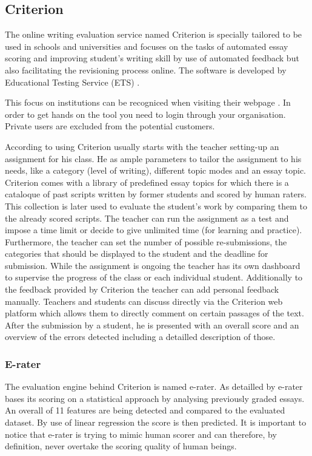 \documentclass[runningheads]{llncs}
\let\OldTextregistered\textregistered
\renewcommand{\textregistered}{\OldTextregistered\xspace}%
\begin{document}
\subsection{Criterion\textregistered}
The online writing evaluation service named Criterion\textregistered is specially tailored to be used in schools and universities and focuses on the tasks of automated essay scoring and improving student's writing skill by use of automated feedback but also facilitating the revisioning process online. The software is developed by Educational Testing Service (ETS) \citep{noauthor_ets_nodate}.

This focus on institutions can be recogniced when visiting their webpage \citep{noauthor_ets_nodate}. In order to get hands on the tool you need to login through your organisation. Private users are excluded from the potential customers. 

According to \textcite{lim_review_2012} using Criterion\textregistered usually starts with the teacher setting-up an assignment for his class. He as ample parameters to tailor the assignment to his needs, like a category (level of writing), different topic modes and an essay topic. Criterion\textregistered comes with a library of predefined essay topics for which there is a cataloque of past scripts written by former students and scored by human raters. This collection is later used to evaluate the student's work by comparing them to the already scored scripts. The teacher can run the assignment as a test and impose a time limit or decide to give unlimited time (for learning and practice). Furthermore, the teacher can set the number of possible re-submissions, the categories that should be displayed to the student and the deadline for submission. While the assignment is ongoing the teacher has its own dashboard to supervise the progress of the class or each individual student. Additionally to the feedback provided by Criterion\textregistered the teacher can add personal feedback manually. Teachers and students can discuss directly via the Criterion\textregistered web platform which allows them to directly comment on certain passages of the text. After the submission by a student, he is presented with an overall score and an overview of the errors detected including a detailled description of those.

\subsubsection{E-rater}
The evaluation engine behind Criterion\textregistered is named e-rater\textregistered. As detailled by \textcite{lim_review_2012} e-rater\textregistered bases its scoring on a statistical approach by analysing previously graded essays. An overall of 11 features are being detected and compared to the evaluated dataset. By use of linear regression the score is then predicted. It is important to notice that e-rater\textregistered is trying to mimic human scorer and can therefore, by definition, never overtake the scoring quality of human beings. 
\end{document}
